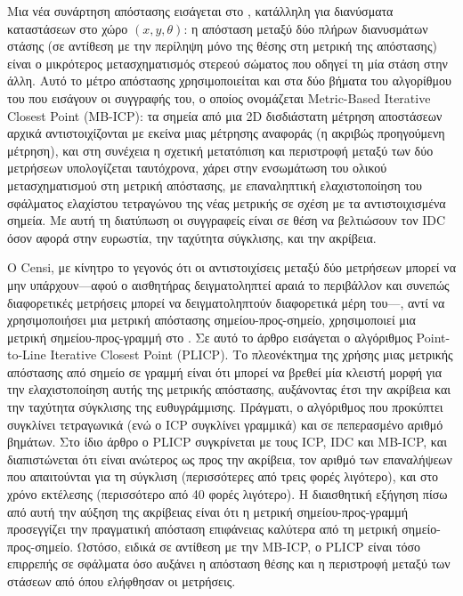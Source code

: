 Μια νέα συνάρτηση απόστασης εισάγεται στο \cite{Minguezb}, κατάλληλη για
διανύσματα καταστάσεων στο χώρο $(x,y,\theta)$: η απόσταση μεταξύ δύο πλήρων
διανυσμάτων στάσης (σε αντίθεση με την περίληψη μόνο της θέσης στη μετρική της
απόστασης) είναι ο μικρότερος μετασχηματισμός στερεού σώματος που οδηγεί τη μία
στάση στην άλλη. Αυτό το μέτρο απόστασης χρησιμοποιείται και στα δύο βήματα του
αλγορίθμου του που εισάγουν οι συγγραφής του, ο οποίος ονομάζεται Metric-Based
Iterative Closest Point (MB-ICP): τα σημεία από μια 2D δισδιάστατη μέτρηση
αποστάσεων αρχικά αντιστοιχίζονται με εκείνα μιας μέτρησης αναφοράς (η ακριβώς
προηγούμενη μέτρηση), και στη συνέχεια η σχετική μετατόπιση και περιστροφή
μεταξύ των δύο μετρήσεων υπολογίζεται ταυτόχρονα, χάρει στην ενσωμάτωση του
ολικού μετασχηματισμού στη μετρική απόστασης, με επαναληπτική ελαχιστοποίηση
του σφάλματος ελαχίστου τετραγώνου της νέας μετρικής σε σχέση με τα
αντιστοιχισμένα σημεία. Με αυτή τη διατύπωση οι συγγραφείς είναι σε θέση να
βελτιώσουν τον IDC όσον αφορά στην ευρωστία, την ταχύτητα σύγκλισης, και την
ακρίβεια.

O Censi, με κίνητρο το γεγονός ότι οι αντιστοιχίσεις μεταξύ δύο μετρήσεων
μπορεί να μην υπάρχουν---αφού ο αισθητήρας δειγματοληπτεί αραιά το περιβάλλον
και συνεπώς διαφορετικές μετρήσεις μπορεί να δειγματοληπτούν διαφορετικά μέρη
του---, αντί να χρησιμοποιήσει μια μετρική απόστασης σημείου-προς-σημείο,
χρησιμοποιεί μια μετρική σημείου-προς-γραμμή στο \cite{Censi2008a}. Σε αυτό το
άρθρο εισάγεται ο αλγόριθμος Point-to-Line Iterative Closest Point (PLICP). Το
πλεονέκτημα της χρήσης μιας μετρικής απόστασης από σημείο σε γραμμή είναι ότι
μπορεί να βρεθεί μία κλειστή μορφή για την ελαχιστοποίηση αυτής της μετρικής
απόστασης, αυξάνοντας έτσι την ακρίβεια και την ταχύτητα σύγκλισης της
ευθυγράμμισης. Πράγματι, ο αλγόριθμος που προκύπτει συγκλίνει τετραγωνικά (ενώ
ο ICP συγκλίνει γραμμικά) και σε πεπερασμένο αριθμό βημάτων. Στο ίδιο άρθρο ο
PLICP συγκρίνεται με τους ICP, IDC και MB-ICP, και διαπιστώνεται ότι είναι
ανώτερος ως προς την ακρίβεια, τον αριθμό των επαναλήψεων που απαιτούνται για
τη σύγκλιση (περισσότερες από τρεις φορές λιγότερο), και στο χρόνο εκτέλεσης
(περισσότερο από 40 φορές λιγότερο). Η διαισθητική εξήγηση πίσω από αυτή την
αύξηση της ακρίβειας είναι ότι η μετρική σημείου-προς-γραμμή προσεγγίζει την
πραγματική απόσταση επιφάνειας καλύτερα από τη μετρική σημείο-προς-σημείο.
Ωστόσο, ειδικά σε αντίθεση με την MB-ICP, ο PLICP είναι τόσο επιρρεπής σε
σφάλματα όσο αυξάνει η απόσταση θέσης και η περιστροφή μεταξύ των στάσεων από
όπου ελήφθησαν οι μετρήσεις.

